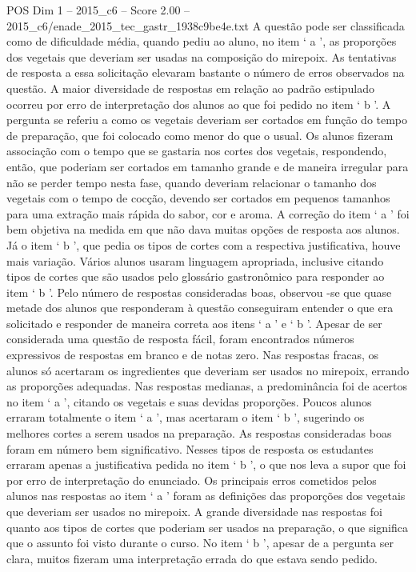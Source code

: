 \begin{textsample}{POS Dim 1 – 2015\_c6 – Score 2.00 – 2015\_c6/enade\_2015\_tec\_gastr\_1938c9be4e.txt}
A questão pode ser classificada como de dificuldade média, quando pediu ao aluno, no item ‘ a ’, as proporções dos vegetais que deveriam ser usadas na composição do mirepoix.
As tentativas de resposta a essa solicitação elevaram bastante o número de erros observados na questão.
A maior diversidade de respostas em relação ao padrão estipulado ocorreu por erro de interpretação dos alunos ao que foi pedido no item ‘ b ’.
A pergunta se referiu a como os vegetais deveriam ser cortados em função do tempo de preparação, que foi colocado como menor do que o usual.
Os alunos fizeram associação com o tempo que se gastaria nos cortes dos vegetais, respondendo, então, que poderiam ser cortados em tamanho grande e de maneira irregular para não se perder tempo nesta fase, quando deveriam relacionar o tamanho dos vegetais com o tempo de cocção, devendo ser cortados em pequenos tamanhos para uma extração mais rápida do sabor, cor e aroma.
A correção do item ‘ a ’ foi bem objetiva na medida em que não dava muitas opções de resposta aos alunos.
Já o item ‘ b ’, que pedia os tipos de cortes com a respectiva justificativa, houve mais variação.
Vários alunos usaram linguagem apropriada, inclusive citando tipos de cortes que são usados pelo glossário gastronômico para responder ao item ‘ b ’.
Pelo número de respostas consideradas boas, observou -se que quase metade dos alunos que responderam à questão conseguiram entender o que era solicitado e responder de maneira correta aos itens ‘ a ’ e ‘ b ’.
Apesar de ser considerada uma questão de resposta fácil, foram encontrados números expressivos de respostas em branco e de notas zero.
Nas respostas fracas, os alunos só acertaram os ingredientes que deveriam ser usados no mirepoix, errando as proporções adequadas.
Nas respostas medianas, a predominância foi de acertos no item ‘ a ’, citando os vegetais e suas devidas proporções.
Poucos alunos erraram totalmente o item ‘ a ’, mas acertaram o item ‘ b ’, sugerindo os melhores cortes a serem usados na preparação.
As respostas consideradas boas foram em número bem significativo.
Nesses tipos de resposta os estudantes erraram apenas a justificativa pedida no item ‘ b ’, o que nos leva a supor que foi por erro de interpretação do enunciado.
Os principais erros cometidos pelos alunos nas respostas ao item ‘ a ’ foram as definições das proporções dos vegetais que deveriam ser usados no mirepoix.
A grande diversidade nas respostas foi quanto aos tipos de cortes que poderiam ser usados na preparação, o que significa que o assunto foi visto durante o curso.
No item ‘ b ’, apesar de a pergunta ser clara, muitos fizeram uma interpretação errada do que estava sendo pedido.

\end{textsample}
